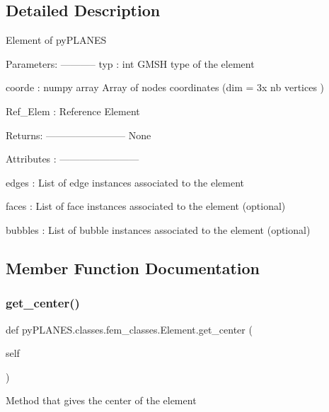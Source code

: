 \subsection{Detailed Description}
\begin{DoxyVerb}Element of pyPLANES

Parameters:
-----------
typ : int
    GMSH type of the element

coorde : numpy array
    Array of nodes coordinates (dim = 3x nb vertices )

Ref_Elem : Reference Element

Returns:
------------------------
None

Attributes :
------------------------

edges : List of edge instances associated to the element

faces : List of face instances associated to the element (optional)

bubbles : List of bubble instances associated to the element (optional)\end{DoxyVerb}
 

\subsection{Member Function Documentation}
\mbox{\label{classpy_p_l_a_n_e_s_1_1classes_1_1fem__classes_1_1_element_ace2dc657fe00985caf3aebda50d27fb9}} 
\subsubsection{\texorpdfstring{get\+\_\+center()}{get\_center()}}
{\footnotesize\ttfamily def py\+P\+L\+A\+N\+E\+S.\+classes.\+fem\+\_\+classes.\+Element.\+get\+\_\+center (\begin{DoxyParamCaption}\item[{}]{self }\end{DoxyParamCaption})}

\begin{DoxyVerb}Method that gives the center of the element\end{DoxyVerb}
 \mbox{\label{classpy_p_l_a_n_e_s_1_1classes_1_1fem__classes_1_1_element_a1ebd212c04bb221d14aecbe36458dfda}} 
